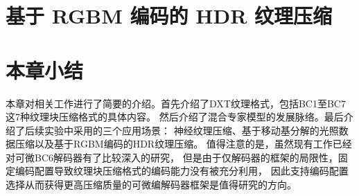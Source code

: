 \section{基于 RGBM 编码的 HDR 纹理压缩}

\section{本章小结}

本章对相关工作进行了简要的介绍。首先介绍了DXT纹理格式，包括BC1至BC7这7种纹理块压缩格式的具体内容。
然后介绍了混合专家模型的发展脉络。最后介绍了后续实验中采用的三个应用场景：
神经纹理压缩、基于移动基分解的光照数据压缩以及基于RGBM编码的HDR纹理压缩。
值得注意的是，虽然现有工作已经对可微BC6解码器有了比较深入的研究，
但是由于仅解码器的框架的局限性，固定编码配置导致纹理块压缩格式的编码能力没有被充分利用，
因此支持编码配置选择从而获得更高压缩质量的可微编解码器框架是值得研究的方向。
